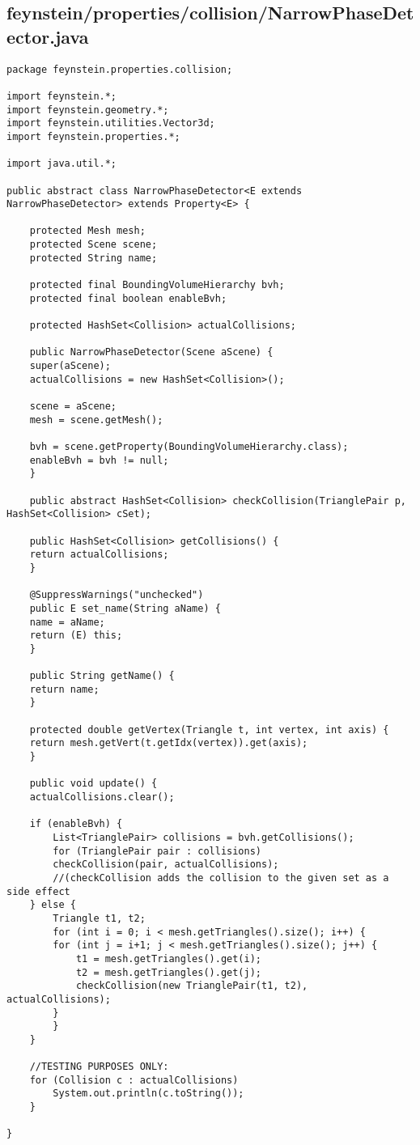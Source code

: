 \subsection*{feynstein/properties/collision/NarrowPhaseDetector.java}
\begin{lstlisting}
package feynstein.properties.collision;

import feynstein.*;
import feynstein.geometry.*;
import feynstein.utilities.Vector3d;
import feynstein.properties.*;

import java.util.*;

public abstract class NarrowPhaseDetector<E extends NarrowPhaseDetector> extends Property<E> {
    
    protected Mesh mesh;
    protected Scene scene;
    protected String name;

    protected final BoundingVolumeHierarchy bvh;
    protected final boolean enableBvh;

    protected HashSet<Collision> actualCollisions;

    public NarrowPhaseDetector(Scene aScene) {
	super(aScene);
	actualCollisions = new HashSet<Collision>();

	scene = aScene;
	mesh = scene.getMesh();

	bvh = scene.getProperty(BoundingVolumeHierarchy.class);
	enableBvh = bvh != null;
    }

    public abstract HashSet<Collision> checkCollision(TrianglePair p, HashSet<Collision> cSet);

    public HashSet<Collision> getCollisions() {
	return actualCollisions;
    }

    @SuppressWarnings("unchecked")
    public E set_name(String aName) {
	name = aName;
	return (E) this;
    }

    public String getName() {
	return name;
    }

    protected double getVertex(Triangle t, int vertex, int axis) {
	return mesh.getVert(t.getIdx(vertex)).get(axis);
    }

    public void update() {
	actualCollisions.clear();

	if (enableBvh) {
	    List<TrianglePair> collisions = bvh.getCollisions();
	    for (TrianglePair pair : collisions)
		checkCollision(pair, actualCollisions);
		//(checkCollision adds the collision to the given set as a side effect
	} else {
	    Triangle t1, t2;
	    for (int i = 0; i < mesh.getTriangles().size(); i++) {
		for (int j = i+1; j < mesh.getTriangles().size(); j++) {
		    t1 = mesh.getTriangles().get(i);
		    t2 = mesh.getTriangles().get(j);
		    checkCollision(new TrianglePair(t1, t2), actualCollisions);
		}
	    }
	}
	
	//TESTING PURPOSES ONLY:
	for (Collision c : actualCollisions)
	    System.out.println(c.toString());
    }

}\end{lstlisting}

